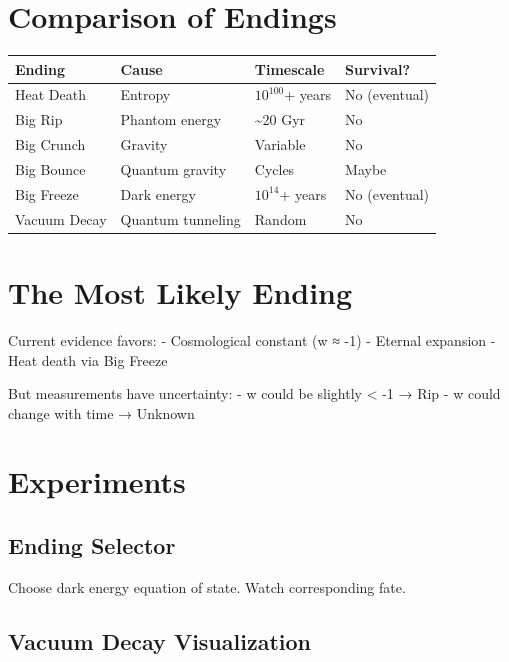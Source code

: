 \documentclass[
  11pt,
  letterpaper,
  twoside,
  openright]{book}
\begin{document}
\section{Comparison of Endings}\label{comparison-of-endings}

\begin{longtable}[]{@{}llll@{}}
\toprule\noalign{}
Ending & Cause & Timescale & Survival? \\
\midrule\noalign{}
\endhead
\bottomrule\noalign{}
\endlastfoot
Heat Death & Entropy & \(10^{100}\)+ years & No (eventual) \\
Big Rip & Phantom energy & \textasciitilde20 Gyr & No \\
Big Crunch & Gravity & Variable & No \\
Big Bounce & Quantum gravity & Cycles & Maybe \\
Big Freeze & Dark energy & \(10^{14}\)+ years & No (eventual) \\
Vacuum Decay & Quantum tunneling & Random & No \\
\end{longtable}

\section{The Most Likely Ending}\label{the-most-likely-ending}

Current evidence favors: - Cosmological constant (w ≈ -1) - Eternal
expansion - Heat death via Big Freeze

But measurements have uncertainty: - w could be slightly \textless{} -1
→ Rip - w could change with time → Unknown

\section{Experiments}\label{experiments-42}

\subsection{Ending Selector}\label{ending-selector}

Choose dark energy equation of state. Watch corresponding fate.

\subsection{Vacuum Decay
Visualization}\label{vacuum-decay-visualization}
\end{document}
